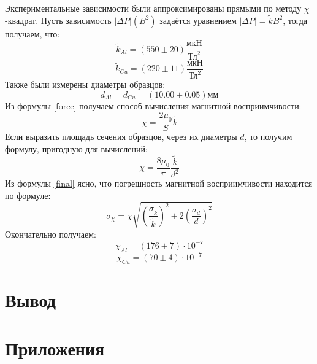 \documentclass[15pt,a5paper,reqno]{article}
\begin{document}
        Экспериментальные зависимости были аппроксимированы прямыми по методу $\chi$-квадрат. Пусть зависимость $|\Delta P| (B^2)$ задаётся уравнением $|\Delta P| = \tilde k B^2$, тогда получаем, что:
        \begin{equation}
            \tilde k_{Al} = (550 \pm 20) \frac{\text{мкН}}{\text{Тл}^2}
        \end{equation}
        \begin{equation}
            \tilde k_{Cu} = (220 \pm 11) \frac{\text{мкН}}{\text{Тл}^2}
        \end{equation}
        Также были измерены диаметры образцов:
        \begin{equation*}
            d_{Al} = d_{Cu} = (10.00 \pm 0.05) мм
        \end{equation*}
        Из формулы \eqref{force} получаем способ вычисления магнитной восприимчивости:
        \begin{equation*}
            \chi = \frac{2\mu_0}{S}\tilde k
        \end{equation*}
        Если выразить площадь сечения образцов, через их диаметры $d$, то получим формулу, пригодную для вычислений:
        \begin{equation}\label{final}
            \boxed{\chi = \frac{8\mu_0}{\pi}\frac{\tilde k}{d^2}}
        \end{equation}
        Из формулы \eqref{final} ясно, что погрешность магнитной восприимчивости находится по формуле:
        \begin{equation*}
            \sigma_{\chi} = \chi\sqrt{\left(\frac{\sigma_{\tilde k}}{\tilde k}\right)^2 + 2\left(\frac{\sigma_d}{d}\right)^2}
        \end{equation*}
        Окончательно получаем:
        \begin{equation*}
            \chi_{Al} = (176 \pm 7)\cdot 10^{-7}
        \end{equation*}
        \begin{equation*}
            \chi_{Cu} = (70 \pm 4)\cdot 10^{-7}
        \end{equation*}
        
    
\section{Вывод}

        
    
\newpage
\section{Приложения}
\end{document}

